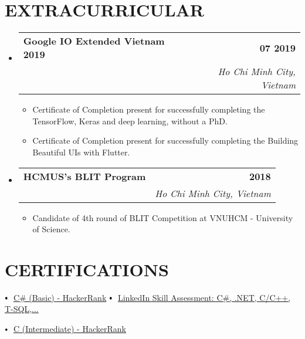\documentclass[letterpaper,11pt]{article}
\makeatletter
\newcommand{\resumeItem}[1]{
  \item\small{
    {#1 \vspace{-2pt}}
  }
}
\newcommand{\resumeSubheading}[4]{
  \vspace{-2pt}\item
    \begin{tabular*}{1.0\textwidth}[t]{l@{\extracolsep{\fill}}r}
      \textbf{\large#1} & \textbf{\small #2} \\
      \textit{\large#3} & \textit{\small #4} \\
      
    \end{tabular*}\vspace{-7pt}
}
\newcommand{\resumeSubHeadingListStart}{\begin{itemize}[leftmargin=0.0in, label={}]}
\newcommand{\resumeSubHeadingListEnd}{\end{itemize}}
\newcommand{\resumeItemListStart}{\begin{itemize}}
\newcommand{\resumeItemListEnd}{\end{itemize}\vspace{-5pt}}
\newcommand\sbullet[1][.5]{\mathbin{\vcenter{\hbox{\scalebox{#1}{$\bullet$}}}}}
\makeatother
\begin{document}
\section{EXTRACURRICULAR}
    \resumeSubHeadingListStart
        \resumeSubheading{Google IO Extended Vietnam 2019 \href{https://drive.google.com/drive/folders/1k5h6xw7oFICgEAcnXmVP1wcZdPf8Fa5k?usp=sharing}{\raisebox{-0.1\height}\faExternalLink } }{07 2019}
        {}{Ho Chi Minh City, Vietnam}
            \resumeItemListStart
                \resumeItem{\normalsize{Certificate of Completion present for successfully completing the TensorFlow, Keras and deep learning, without a PhD.}}
                \resumeItem{\normalsize{Certificate of Completion present for successfully completing the Building Beautiful UIs with Flutter.}}
            \resumeItemListEnd

        \resumeSubheading{HCMUS's BLIT Program}{2018}
        {}{Ho Chi Minh City, Vietnam}
            \resumeItemListStart
                \resumeItem{\normalsize{Candidate of 4th round of BLIT Competition at VNUHCM - University of Science.}}
            \resumeItemListEnd
    \resumeSubHeadingListEnd
 \vspace{-11pt}
 

\section{CERTIFICATIONS}

\hspace{0.15in} $\sbullet[.7] \hspace{0.1cm}$ {\href{https://www.hackerrank.com/certificates/229a5a0f646d}{C\# (Basic) - HackerRank} \href{https://www.hackerrank.com/certificates/229a5a0f646d}{\raisebox{-0.1\height}\faExternalLink }} \hspace{1.3cm}
$\sbullet[.7] \hspace{0.1cm}$ {\href{https://www.linkedin.com/in/phnaharris/details/skills/}{LinkedIn Skill Assessment: C\#, .NET, C/C++, T-SQL,...} \href{https://www.linkedin.com/in/phna-harris/details/skills/}{\raisebox{-0.1\height}\faExternalLink }}

\hspace{0.15in} $\sbullet[.7] \hspace{0.1cm}$ {\href{https://www.hackerrank.com/certificates/7cd765401419}{C (Intermediate) - HackerRank} \href{https://www.hackerrank.com/certificates/7cd765401419}{\raisebox{-0.1\height}\faExternalLink }} \hspace{0.37cm}
\end{document}

